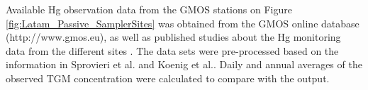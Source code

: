 \begin{flushleft}
  Available Hg observation data from the GMOS stations on Figure  \ref{fig:Latam_Passive_SamplerSites} was obtained from the GMOS online database (http://www.gmos.eu), as well as published studies about the Hg monitoring data from the different sites  \cite{koenig_seasonal_2021,sprovieri_atmospheric_2016}. The data sets were pre-processed based on the information in Sprovieri et al.\cite{sprovieri_atmospheric_2016} and Koenig et al.\cite{koenig_seasonal_2021}. Daily and annual averages of the observed TGM concentration were calculated to compare with the \gc output. 
\end{flushleft}





